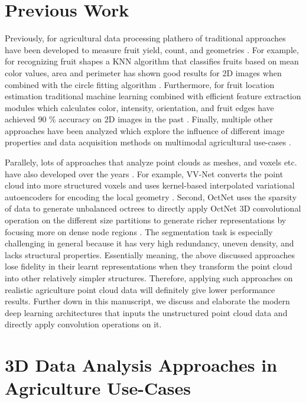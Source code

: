 \documentclass{article}
\begin{document}
\section{Previous Work}


Previously, for agricultural data processing plathero of traditional approaches have been developed to measure fruit yield, count, and geometries \cite{syal2013survey}.
For example, for recognizing fruit shapes a KNN algorithm that classifies fruits based on mean color values, area and perimeter has shown good results for 2D images when combined with the circle fitting algorithm \cite{seng2009new}.
Furthermore, for fruit location estimation traditional machine learning combined with efficient feature extraction modules which calculates color, intensity, orientation, and fruit edges have achieved 90 \% accuracy on 2D images in the past \cite{patel2011fruit}.
Finally, multiple other approaches have been analyzed which explore the influence of different image properties and data acquisition methods on multimodal agricultural use-cases \cite{jimenez2000survey}.


Parallely, lots of approaches that analyze point clouds as meshes, and voxels etc. have also developed over the years \cite{nguyen20133d}.
For example, VV-Net converts the point cloud into more structured voxels and uses kernel-based interpolated variational autoencoders for encoding the local geometry \cite{meng2019vv}.
Second, OctNet uses the sparsity of data to generate unbalanced octrees to directly apply OctNet 3D convolutional operation on the different size partitions to generate richer representations by focusing more on dense node regions \cite{riegler2017octnet}.
The segmentation task is especially challenging in general because it has very high redundancy, uneven density, and lacks structural properties.
Essentially meaning, the above discussed approaches lose fidelity in their learnt representations when they transform the point cloud into other relatively simpler structures.
Therefore, applying such approaches on realistic agriculture point cloud data will definitely give lower performance results.
Further down in this manuscript, we discuss and elaborate the modern deep learning architectures that inputs the unstructured point cloud data and directly apply convolution operations on it.


\section{3D Data Analysis Approaches in Agriculture Use-Cases}
\end{document}
